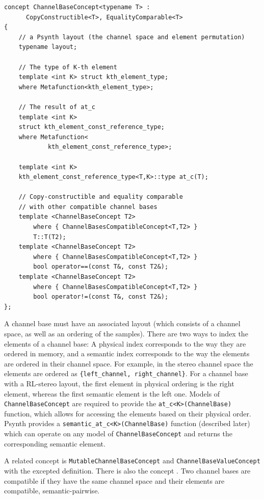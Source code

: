 \begin{lstlisting}
concept ChannelBaseConcept<typename T> :
      CopyConstructible<T>, EqualityComparable<T>
{
    // a Psynth layout (the channel space and element permutation)
    typename layout;     
        
    // The type of K-th element
    template <int K> struct kth_element_type;
    where Metafunction<kth_element_type>;
    
    // The result of at_c
    template <int K> 
    struct kth_element_const_reference_type;
    where Metafunction<
            kth_element_const_reference_type>;        
    
    template <int K> 
    kth_element_const_reference_type<T,K>::type at_c(T);

    // Copy-constructible and equality comparable 
    // with other compatible channel bases
    template <ChannelBaseConcept T2> 
        where { ChannelBasesCompatibleConcept<T,T2> } 
        T::T(T2);
    template <ChannelBaseConcept T2> 
        where { ChannelBasesCompatibleConcept<T,T2> } 
        bool operator==(const T&, const T2&);
    template <ChannelBaseConcept T2> 
        where { ChannelBasesCompatibleConcept<T,T2> } 
        bool operator!=(const T&, const T2&);
};
\end{lstlisting}

A channel base must have an associated layout (which consists of a
channel space, as well as an ordering of the samples).  There are two
ways to index the elements of a channel base: A physical index
corresponds to the way they are ordered in memory, and a semantic
index corresponds to the way the elements are ordered in their channel
space.  For example, in the stereo channel space the elements are
ordered as \texttt{\{left\_channel, right\_channel\}}. For a channel
base with a RL-stereo layout, the first element in physical ordering
is the right element, whereas the first semantic element is the left
one.  Models of \texttt{ChannelBaseConcept} are required to provide
the \texttt{at\_c<K>(ChannelBase)} function, which allows for
accessing the elements based on their physical order. Psynth provides
a \texttt{semantic\_at\_c<K>(ChannelBase)} function (described
later) which can operate on any model of \texttt{ChannelBaseConcept}
and returns the corresponding semantic element.

A related concept is \texttt{Mutable\-Channel\-Base\-Con\-cept} and
\texttt{Chan\-nel\-Base\-Value\-Con\-cept} with the excepted
definition. There is also the concept
. Two channel bases are
compatible if they have the same channel space and their elements are
compatible, semantic-pairwise.

